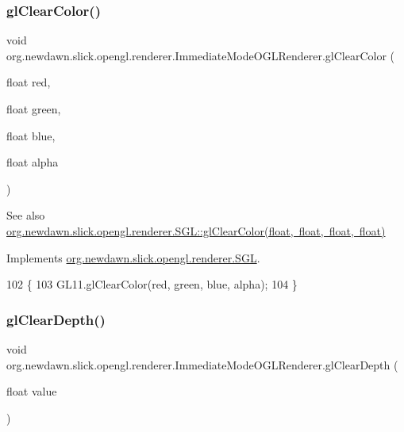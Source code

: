 \subsubsection{\texorpdfstring{gl\+Clear\+Color()}{glClearColor()}}
{\footnotesize\ttfamily void org.\+newdawn.\+slick.\+opengl.\+renderer.\+Immediate\+Mode\+O\+G\+L\+Renderer.\+gl\+Clear\+Color (\begin{DoxyParamCaption}\item[{float}]{red,  }\item[{float}]{green,  }\item[{float}]{blue,  }\item[{float}]{alpha }\end{DoxyParamCaption})\hspace{0.3cm}{\ttfamily [inline]}}

\begin{DoxySeeAlso}{See also}
\mbox{\hyperlink{interfaceorg_1_1newdawn_1_1slick_1_1opengl_1_1renderer_1_1_s_g_l_ad629840de5bb3d1baed92ccf8085068b}{org.\+newdawn.\+slick.\+opengl.\+renderer.\+S\+G\+L\+::gl\+Clear\+Color(float, float, float, float)}} 
\end{DoxySeeAlso}


Implements \mbox{\hyperlink{interfaceorg_1_1newdawn_1_1slick_1_1opengl_1_1renderer_1_1_s_g_l_ad629840de5bb3d1baed92ccf8085068b}{org.\+newdawn.\+slick.\+opengl.\+renderer.\+S\+GL}}.


\begin{DoxyCode}
102                                                                               \{
103         GL11.glClearColor(red, green, blue, alpha);
104     \}
\end{DoxyCode}
\mbox{\label{classorg_1_1newdawn_1_1slick_1_1opengl_1_1renderer_1_1_immediate_mode_o_g_l_renderer_a00cacf4aac9d008657c1be3c9df5da90}} 
\subsubsection{\texorpdfstring{gl\+Clear\+Depth()}{glClearDepth()}}
{\footnotesize\ttfamily void org.\+newdawn.\+slick.\+opengl.\+renderer.\+Immediate\+Mode\+O\+G\+L\+Renderer.\+gl\+Clear\+Depth (\begin{DoxyParamCaption}\item[{float}]{value }\end{DoxyParamCaption})\hspace{0.3cm}{\ttfamily [inline]}}

